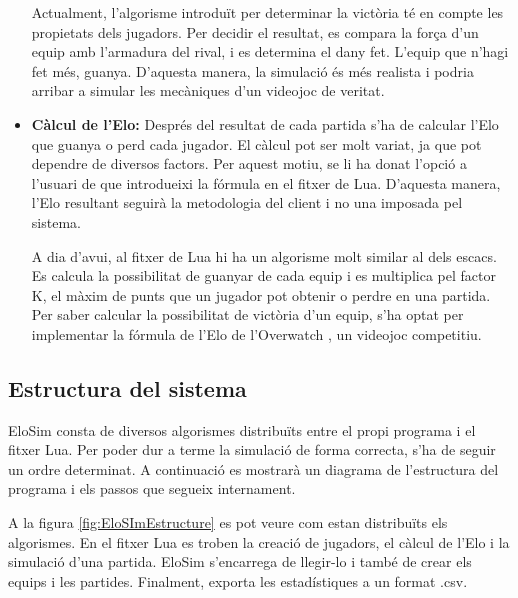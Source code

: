 \documentclass[a4paper]{article}
\begin{document}
\begin{itemize}
    Actualment, l'algorisme introduït per determinar la victòria té en compte les propietats dels jugadors. Per decidir el resultat, es compara la força d'un equip amb l'armadura del rival, i es determina el dany fet. L'equip que n'hagi fet més, guanya. D'aquesta manera, la simulació és més realista i podria arribar a simular les mecàniques d'un videojoc de veritat.

    \item \textbf{Càlcul de l'Elo:} Després del resultat de cada partida s'ha de calcular l'Elo que guanya o perd cada jugador. El càlcul pot ser molt variat, ja que pot dependre de diversos factors. Per aquest motiu, se li ha donat l'opció a l'usuari de que introdueixi la fórmula en el fitxer de Lua. D'aquesta manera, l'Elo resultant seguirà la metodologia del client i no una imposada pel sistema. 
    
    A dia d'avui, al fitxer de Lua hi ha un algorisme molt similar al dels escacs. Es calcula la possibilitat de guanyar de cada equip i es multiplica pel factor K, el màxim de punts que un jugador pot obtenir o perdre en una partida. Per saber calcular la possibilitat de victòria d'un equip, s'ha optat per implementar la fórmula de l'Elo de l'Overwatch \cite{overwatchElo}, un videojoc competitiu.
\end{itemize}

\subsection{Estructura del sistema}

EloSim consta de diversos algorismes distribuïts entre el propi programa i el fitxer Lua. Per poder dur a terme la simulació de forma correcta, s'ha de seguir un ordre determinat. A continuació es mostrarà un diagrama de l'estructura del programa i els passos que segueix internament.

A la figura \ref{fig:EloSImEstructure} es pot veure com estan distribuïts els algorismes. En el fitxer Lua es troben la creació de jugadors, el càlcul de l'Elo i la simulació d'una partida. EloSim s'encarrega de llegir-lo i també de crear els equips i les partides. Finalment, exporta les estadístiques a un format .csv.
\end{document}
